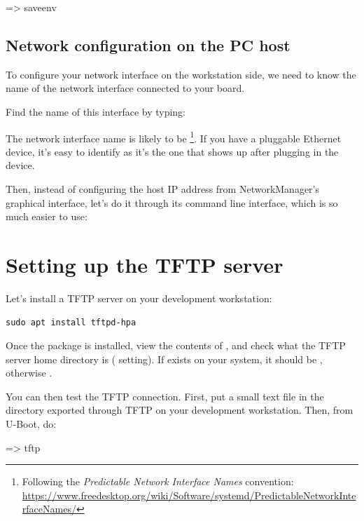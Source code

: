 \begin{ubootinput}
=> saveenv
\end{ubootinput}

\subsection{Network configuration on the PC host}

To configure your network interface on the workstation side, we need
to know the name of the network interface connected to your board.

Find the name of this interface by typing:

The network interface name is likely to be
\footnote{Following the {\em Predictable Network Interface
Names} convention:
\url{https://www.freedesktop.org/wiki/Software/systemd/PredictableNetworkInterfaceNames/}}.
If you have a pluggable Ethernet device, it's easy to identify as it's
the one that shows up after plugging in the device.

Then, instead of configuring the host IP address from NetworkManager's
graphical interface, let's do it through its command line interface,
which is so much easier to use:


\section{Setting up the TFTP server}

Let's install a TFTP server on your development workstation:

\begin{verbatim}
sudo apt install tftpd-hpa
\end{verbatim}

Once the package is installed, view the contents of
, and check what the TFTP server home directory is
( setting). If  exists on your system,
it should be , otherwise .

You can then test the TFTP connection. First, put a small text file in
the directory exported through TFTP on your development
workstation. Then, from U-Boot, do:

\begin{ubootinput}
=> tftp %
\end{ubootinput}

